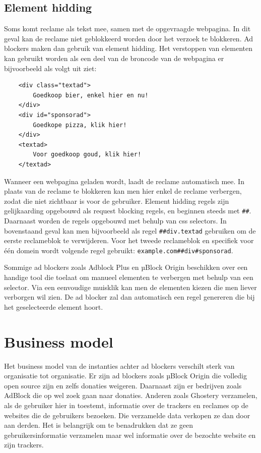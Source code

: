 \documentclass[pdftex,a4paper,12pt,twoside]{report}
\begin{document}
\subsection{ Element hidding}
\label{sec:Element hidding}
Soms komt reclame als tekst mee, samen met de opgevraagde webpagina. In dit geval kan de reclame niet geblokkeerd worden door het verzoek te blokkeren. Ad blockers maken dan gebruik van element hidding. Het verstoppen van elementen kan gebruikt worden als een deel van de broncode van de webpagina er bijvoorbeeld als volgt uit ziet:
\lstset{language=Html,tabsize=2}  
\begin{lstlisting}
	<div class="textad">
		Goedkoop bier, enkel hier en nu!
	</div>
	<div id="sponsorad">
		Goedkope pizza, klik hier!
	</div>
	<textad>
		Voor goedkoop goud, klik hier!
	</textad>
\end{lstlisting}

Wanneer een webpagina geladen wordt, laadt de reclame automatisch mee. In plaats van de reclame te blokkeren kan men hier enkel de reclame verbergen, zodat die niet zichtbaar is voor de gebruiker. Element hidding regels zijn gelijkaarding opgebouwd als request blocking regels, en beginnen steeds met \texttt{\#\#}. Daarnaast worden de regels opgebouwd met behulp van css selectors. In bovenstaand geval kan men bijvoorbeeld als regel \texttt{\#\#div.textad} gebruiken om de eerste reclameblok te verwijderen. Voor het tweede reclameblok en specifiek voor één domein wordt volgende regel gebruikt: \texttt{example.com\#\#div\#sponsorad}.

Sommige ad blockers zoals Adblock Plus en µBlock Origin beschikken over een handige tool die toelaat om manueel elementen te verbergen met behulp van een selector. Via een eenvoudige muisklik kan men de elementen kiezen die men liever verborgen wil zien. De ad blocker zal dan automatisch een regel genereren die bij het geselecteerde element hoort.

\section{Business model}
\label{sec:Business model}
Het business model van de instanties achter ad blockers verschilt sterk van organisatie tot organisatie. Er zijn ad blockers zoals µBlock Origin die volledig open source zijn en zelfs donaties weigeren. Daarnaast zijn er bedrijven zoals AdBlock die op wel zoek gaan naar donaties. Anderen zoals Ghostery verzamelen, als de gebruiker hier in toestemt, informatie over de trackers en reclames op de websites die de gebruikers bezoeken. Die verzamelde data verkopen ze dan door aan derden. Het is belangrijk om te benadrukken dat ze geen gebruikersinformatie verzamelen maar wel informatie over de bezochte website en zijn trackers.
\end{document}
